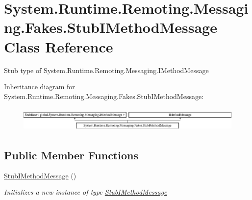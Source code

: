 \hypertarget{class_system_1_1_runtime_1_1_remoting_1_1_messaging_1_1_fakes_1_1_stub_i_method_message}{\section{System.\-Runtime.\-Remoting.\-Messaging.\-Fakes.\-Stub\-I\-Method\-Message Class Reference}
\label{class_system_1_1_runtime_1_1_remoting_1_1_messaging_1_1_fakes_1_1_stub_i_method_message}
}


Stub type of System.\-Runtime.\-Remoting.\-Messaging.\-I\-Method\-Message 


Inheritance diagram for System.\-Runtime.\-Remoting.\-Messaging.\-Fakes.\-Stub\-I\-Method\-Message\-:\begin{figure}[H]
\begin{center}
\leavevmode
\includegraphics[height=1.264108cm]{class_system_1_1_runtime_1_1_remoting_1_1_messaging_1_1_fakes_1_1_stub_i_method_message}
\end{center}
\end{figure}
\subsection*{Public Member Functions}
\begin{DoxyCompactItemize}
\item 
\hyperlink{class_system_1_1_runtime_1_1_remoting_1_1_messaging_1_1_fakes_1_1_stub_i_method_message_a36cc3503c4401d25ad0be6a92f8bd8fe}{Stub\-I\-Method\-Message} ()
\begin{DoxyCompactList}\small\item\em Initializes a new instance of type \hyperlink{class_system_1_1_runtime_1_1_remoting_1_1_messaging_1_1_fakes_1_1_stub_i_method_message}{Stub\-I\-Method\-Message}\end{DoxyCompactList}\end{DoxyCompactItemize}
